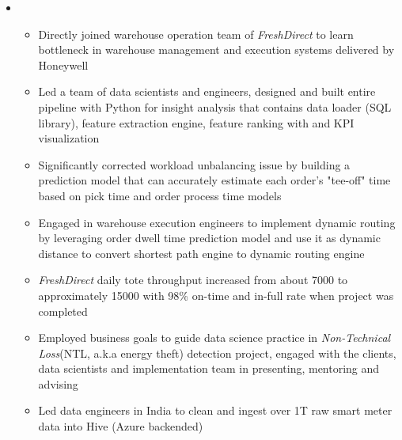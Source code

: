 \documentclass[11pt,a4paper,sans]{moderncv}        %
\begin{document}
\begin{itemize}
	\item{
		{\vspace{3pt}
			\begin{itemize}
				\item Directly joined warehouse operation team of \emph{FreshDirect} to learn bottleneck in warehouse management and execution systems delivered by Honeywell
				\item Led a team of data scientists and engineers, designed and built entire pipeline with Python for insight analysis that contains data loader (SQL library), feature extraction engine, feature ranking with and KPI visualization
				\item Significantly corrected workload unbalancing issue by building a prediction model that can accurately estimate each order's "tee-off" time based on pick time and order process time models
				\item Engaged in warehouse execution engineers to implement dynamic routing by leveraging order dwell time prediction model and use it as dynamic distance to convert shortest path engine to dynamic routing engine
				\item \emph{FreshDirect} daily tote throughput increased from about 7000 to approximately 15000 with 98\% on-time and in-full rate when project was completed
			\end{itemize}
		    \begin{itemize}
				\item Employed business goals to guide data science practice in \emph{Non-Technical Loss}(NTL, a.k.a energy theft) detection project, engaged with the clients, data scientists and implementation team in presenting, mentoring and advising 
				\item Led data engineers in India to clean and ingest over 1T raw smart meter data into Hive ({Azure} backended)

\end{itemize}}}
\end{itemize}
\end{document}
